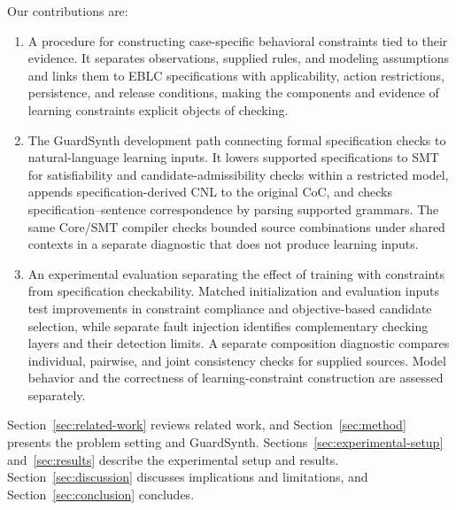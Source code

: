 Our contributions are:
\begin{enumerate}
\item A procedure for constructing case-specific behavioral constraints tied
to their evidence. It separates observations, supplied rules, and modeling
assumptions and links them to EBLC specifications with applicability, action
restrictions, persistence, and release conditions, making the components and
evidence of learning constraints explicit objects of checking.
\item The GuardSynth development path connecting formal specification checks
to natural-language learning inputs. It lowers supported specifications to SMT
for satisfiability and candidate-admissibility checks within a restricted model,
appends specification-derived CNL to the original CoC, and checks
specification--sentence correspondence by parsing supported grammars. The same
Core/SMT compiler checks bounded source combinations under shared contexts in a
separate diagnostic that does not produce learning inputs.
\item An experimental evaluation separating the effect of training with
constraints from specification checkability. Matched initialization and
evaluation inputs test improvements in constraint compliance and
objective-based candidate selection, while separate fault injection identifies
complementary checking layers and their detection limits. A separate
composition diagnostic compares individual, pairwise, and joint consistency
checks for supplied sources. Model behavior and
the correctness of learning-constraint construction are assessed separately.
\end{enumerate}

Section~\ref{sec:related-work} reviews related work, and
Section~\ref{sec:method} presents the problem setting and GuardSynth.
Sections~\ref{sec:experimental-setup} and~\ref{sec:results} describe the
experimental setup and results. Section~\ref{sec:discussion} discusses
implications and limitations, and Section~\ref{sec:conclusion} concludes.
